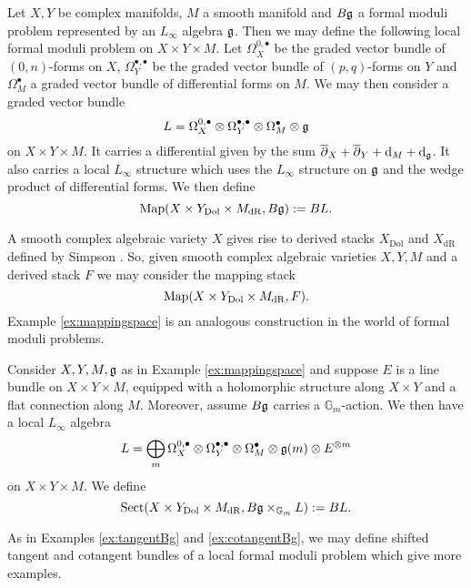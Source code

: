 \documentclass[10pt, oneside]{article}
\newcommand{\Gm}{\mathbb{G}_m}
\newcommand{\Sect}{\mathrm{Sect}}
\begin{document}
\begin{example}
Let $X,Y$ be complex manifolds, $M$ a smooth manifold and $B\mathfrak g$ a formal moduli problem represented by an $L_\infty$ algebra $\mathfrak g$. Then we may define the following local formal moduli problem on $X\times Y\times M$. Let $\Omega^{0, \bullet}_X$ be the graded vector bundle of $(0, n)$-forms on $X$, $\Omega^{\bullet, \bullet}_Y$ be the graded vector bundle of $(p, q)$-forms on $Y$ and $\Omega^\bullet_M$ a graded vector bundle of differential forms on $M$. We may then consider a graded vector bundle
\[L = \Omega^{0,\bullet}_X\otimes \Omega^{\bullet, \bullet}_Y\otimes \Omega^\bullet_M\otimes \mathfrak g\]
on $X\times Y\times M$. It carries a differential given by the sum $\overline{\partial}_X + \overline{\partial}_Y + {\rm d}_M + {\rm d}_\mathfrak g$. It also carries a local $L_\infty$ structure which uses the $L_\infty$ structure on $\mathfrak g$ and the wedge product of differential forms. We then define
\[\operatorname{Map}(X\times Y_{\mathrm{Dol}}\times M_{\mathrm{dR}}, B\mathfrak g) := B L.\]
\label{ex:mappingspace}
\end{example}

\begin{remark}
A smooth complex algebraic variety $X$ gives rise to derived stacks $X_{\mathrm{Dol}}$ and $X_{\mathrm{dR}}$ defined by Simpson \cite{Simpson,PTVV}. So, given smooth complex algebraic varieties $X,Y,M$ and a derived stack $F$ we may consider the mapping stack
\[\operatorname{Map}(X\times Y_{\mathrm{Dol}}\times M_{\mathrm{dR}}, F).\]
Example \ref{ex:mappingspace} is an analogous construction in the world of formal moduli problems.
\end{remark}

\begin{example}
Consider $X, Y, M, \mathfrak g$ as in Example \ref{ex:mappingspace} and suppose $E$ is a line bundle on $X\times Y\times M$, equipped with a holomorphic structure along $X\times Y$ and a flat connection along $M$. Moreover, assume $B\mathfrak g$ carries a $\Gm$-action. We then have a local $L_\infty$ algebra
\[L = \bigoplus_m \Omega^{0,\bullet}_X\otimes \Omega^{\bullet, \bullet}_Y\otimes \Omega^\bullet_M\otimes \mathfrak g(m)\otimes E^{\otimes m}\]
on $X\times Y\times M$. We define
\[\Sect(X\times Y_{\mathrm{Dol}}\times M_{\mathrm{dR}}, B\fg\times_{\Gm} L) := B L.\]
\end{example}

As in Examples \ref{ex:tangentBg} and \ref{ex:cotangentBg}, we may define shifted tangent and cotangent bundles of a local formal moduli problem which give more examples.
\end{document}
